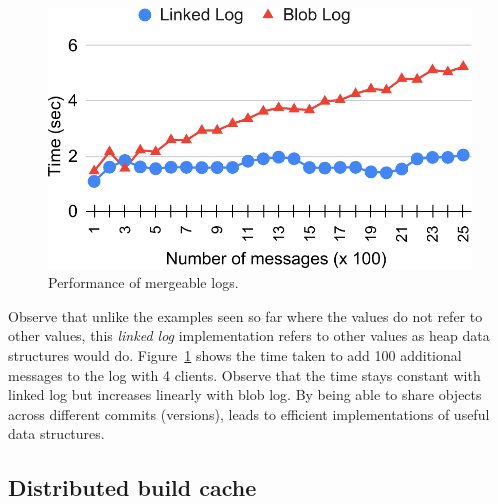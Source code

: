 \begin{figure}
	\vspace{-0.5cm}
	\centering
	\includegraphics[scale=0.45]{results/log}
	\caption{Performance of mergeable logs.}
	\label{res:log}
	\vspace{-1.5cm}
\end{figure}
Observe that unlike the examples seen so far where the values do not refer to
other values, this \emph{linked log} implementation refers to other values as
heap data structures would do. Figure~\ref{res:log} shows the time taken to add
100 additional messages to the log with 4 clients. Observe that the time stays
constant with linked log but increases linearly with blob log. By being able to
share objects across different commits (versions), \name leads to efficient
implementations of useful data structures.

\subsection{Distributed build cache}

